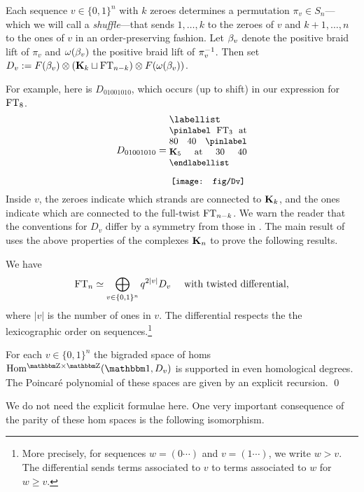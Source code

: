 \begin{definition}\label{def:shuffleAndDv}
Each sequence $v \in \{0, 1\}^n$ with $k$ zeroes determines a permutation $\pi_v\in S_n$---which we will call a \emph{shuffle}---that sends $1,\ldots,k$ to the zeroes of $v$ and $k+1,\ldots,n$ to the ones of $v$ in an order-preserving fashion.  Let $\beta_v$ denote the positive braid lift of $\pi_v$ and $\omega(\beta_v)$ the positive braid lift of $\pi_v^{-1}$.  Then set $D_v := F(\beta_v)\otimes({\mathbf K}_k\sqcup \operatorname{FT}_{n-k})\otimes F(\omega(\beta_v))$.
\end{definition}
For example, here is $D_{01001010}$, which occurs (up to shift) in our expression for $\operatorname{FT}_8$.
 \[
 D_{01001010}=
\begin{minipage}{1.1in}
\labellist
\small
\pinlabel $\FT_3$ at 80 40
\pinlabel $\KB_5$ at 30 40
\endlabellist
\begin{center}\texttt{[image: fig/Dv]}\end{center}
\end{minipage}
 \]
Inside $v$, the zeroes indicate which strands are connected to ${\mathbf K}_k$, and the ones indicate which are connected to the full-twist $\operatorname{FT}_{n-k}$.  We warn the reader that the conventions for $D_v$ differ by a symmetry from those in \cite{ElHog16a}.  The main result of \cite{ElHog16a} uses the above properties of the complexes ${\mathbf K}_n$ to prove the following results.

\begin{theorem}\label{thm:ftcomputation}
We have
\begin{equation}\label{eq:ftexpression}
\operatorname{FT}_n \simeq  \bigoplus_{v\in \{0,1\}^n} q^{2|v|}D_v \ \ \ \text{ with twisted differential},
\end{equation}
where $|v|$ is the number of ones in $v$.  The differential respects the the lexicographic order on sequences.\footnote{More precisely, for sequences $w = (0\cdots)$ and $v=(1\cdots)$, we write $w > v$. The differential sends terms associated to $v$ to terms associated to $w$ for $w \ge v$.}
\end{theorem}



\begin{theorem}\label{thm:parity}
For each $v\in \{0,1\}^n$ the bigraded space of homs $\Homgg(\one,D_v)$ is supported in even homological degrees.  The Poincar\'e polynomial of these spaces are given by an explicit recursion.  \qed
\end{theorem}



We do not need the explicit formulae here.  One very important consequence of the parity of these hom spaces is the following isomorphism.

